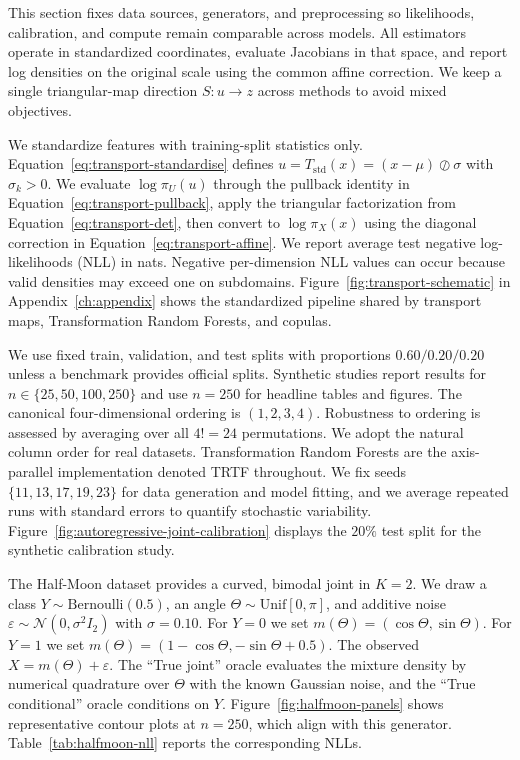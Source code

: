 \documentclass[11pt,a4paper,twoside]{book}\usepackage[]{graphicx}\usepackage[]{xcolor}
\begin{document}
This section fixes data sources, generators, and preprocessing so likelihoods, calibration, and compute remain comparable across models. All estimators operate in standardized coordinates, evaluate Jacobians in that space, and report log densities on the original scale using the common affine correction. We keep a single triangular-map direction $S:u \rightarrow z$ across methods to avoid mixed objectives.

We standardize features with training-split statistics only. Equation~\eqref{eq:transport-standardise} defines $u = T_{\mathrm{std}}(x) = (x-\mu)\oslash \sigma$ with $\sigma_k > 0$. We evaluate $\log \pi_U(u)$ through the pullback identity in Equation~\eqref{eq:transport-pullback}, apply the triangular factorization from Equation~\eqref{eq:transport-det}, then convert to $\log \pi_X(x)$ using the diagonal correction in Equation~\eqref{eq:transport-affine}. We report average test negative log-likelihoods (NLL) in nats. Negative per-dimension NLL values can occur because valid densities may exceed one on subdomains. Figure~\ref{fig:transport-schematic} in Appendix~\ref{ch:appendix} shows the standardized pipeline shared by transport maps, Transformation Random Forests, and copulas.

We use fixed train, validation, and test splits with proportions $0.60/0.20/0.20$ unless a benchmark provides official splits. Synthetic studies report results for $n \in \{25, 50, 100, 250\}$ and use $n=250$ for headline tables and figures. The canonical four-dimensional ordering is $(1,2,3,4)$. Robustness to ordering is assessed by averaging over all $4! = 24$ permutations. We adopt the natural column order for real datasets. Transformation Random Forests are the axis-parallel implementation denoted TRTF throughout. We fix seeds $\{11, 13, 17, 19, 23\}$ for data generation and model fitting, and we average repeated runs with standard errors to quantify stochastic variability. Figure~\ref{fig:autoregressive-joint-calibration} displays the $20\%$ test split for the synthetic calibration study.

The Half-Moon dataset provides a curved, bimodal joint in $K=2$. We draw a class $Y \sim \mathrm{Bernoulli}(0.5)$, an angle $\Theta \sim \mathrm{Unif}[0,\pi]$, and additive noise $\varepsilon \sim \mathcal{N}(0, \sigma^2 I_2)$ with $\sigma = 0.10$. For $Y = 0$ we set $m(\Theta) = (\cos \Theta, \sin \Theta)$. For $Y = 1$ we set $m(\Theta) = (1 - \cos \Theta, -\sin \Theta + 0.5)$. The observed $X = m(\Theta) + \varepsilon$. The ``True joint'' oracle evaluates the mixture density by numerical quadrature over $\Theta$ with the known Gaussian noise, and the ``True conditional'' oracle conditions on $Y$. Figure~\ref{fig:halfmoon-panels} shows representative contour plots at $n=250$, which align with this generator. Table~\ref{tab:halfmoon-nll} reports the corresponding NLLs.
\end{document}
